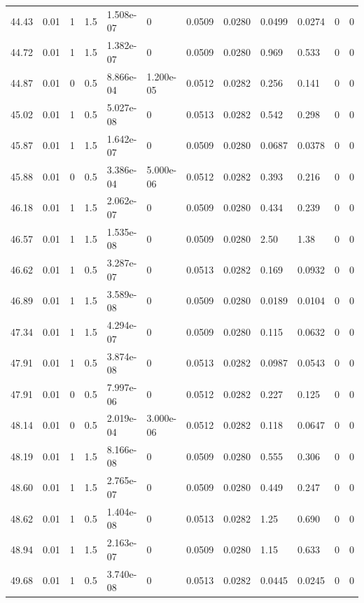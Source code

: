 \documentclass[preview]{standalone}
\begin{document}
{{{{\begin{tabular}{L{1.2cm}C{1.2cm} C{0.3cm}C{0.5cm} C{1.4cm}C{1.4cm} C{1.4cm}C{1.4cm} C{1.6cm}C{1.6cm} C{1.6cm}C{1.6cm}}
  44.43  &  0.01  & 1     & 1.5 &  1.508e-07  & 0  &  0.0509&   0.0280& 0.0499 & 0.0274   &  0 & 0  \\ 
  44.72  &  0.01  & 1     & 1.5 &  1.382e-07  & 0  &  0.0509&   0.0280& 0.969 & 0.533   &  0 & 0  \\ 
  44.87  &  0.01  & 0     & 0.5 &  8.866e-04  & 1.200e-05  &  0.0512&   0.0282& 0.256 & 0.141   &  0 & 0  \\ 
  45.02  &  0.01  & 1     & 0.5 &  5.027e-08  & 0  &  0.0513&   0.0282& 0.542 & 0.298   &  0 & 0  \\ 
  45.87  &  0.01  & 1     & 1.5 &  1.642e-07  & 0  &  0.0509&   0.0280& 0.0687 & 0.0378   &  0 & 0  \\ 
  45.88  &  0.01  & 0     & 0.5 &  3.386e-04  & 5.000e-06  &  0.0512&   0.0282& 0.393 & 0.216   &  0 & 0  \\ 
  46.18  &  0.01  & 1     & 1.5 &  2.062e-07  & 0  &  0.0509&   0.0280& 0.434 & 0.239   &  0 & 0  \\ 
  46.57  &  0.01  & 1     & 1.5 &  1.535e-08  & 0  &  0.0509&   0.0280& 2.50 & 1.38   &  0 & 0  \\ 
  46.62  &  0.01  & 1     & 0.5 &  3.287e-07  & 0  &  0.0513&   0.0282& 0.169 & 0.0932   &  0 & 0  \\ 
  46.89  &  0.01  & 1     & 1.5 &  3.589e-08  & 0  &  0.0509&   0.0280& 0.0189 & 0.0104   &  0 & 0  \\ 
  47.34  &  0.01  & 1     & 1.5 &  4.294e-07  & 0  &  0.0509&   0.0280& 0.115 & 0.0632   &  0 & 0  \\ 
  47.91  &  0.01  & 1     & 0.5 &  3.874e-08  & 0  &  0.0513&   0.0282& 0.0987 & 0.0543   &  0 & 0  \\ 
  47.91  &  0.01  & 0     & 0.5 &  7.997e-06  & 0  &  0.0512&   0.0282& 0.227 & 0.125   &  0 & 0  \\ 
  48.14  &  0.01  & 0     & 0.5 &  2.019e-04  & 3.000e-06  &  0.0512&   0.0282& 0.118 & 0.0647   &  0 & 0  \\ 
  48.19  &  0.01  & 1     & 1.5 &  8.166e-08  & 0  &  0.0509&   0.0280& 0.555 & 0.306   &  0 & 0  \\ 
  48.60  &  0.01  & 1     & 1.5 &  2.765e-07  & 0  &  0.0509&   0.0280& 0.449 & 0.247   &  0 & 0  \\ 
  48.62  &  0.01  & 1     & 0.5 &  1.404e-08  & 0  &  0.0513&   0.0282& 1.25 & 0.690   &  0 & 0  \\ 
  48.94  &  0.01  & 1     & 1.5 &  2.163e-07  & 0  &  0.0509&   0.0280& 1.15 & 0.633   &  0 & 0  \\ 
  49.68  &  0.01  & 1     & 0.5 &  3.740e-08  & 0  &  0.0513&   0.0282& 0.0445 & 0.0245   &  0 & 0  \\ 

\end{tabular}}}}}
\end{document}
